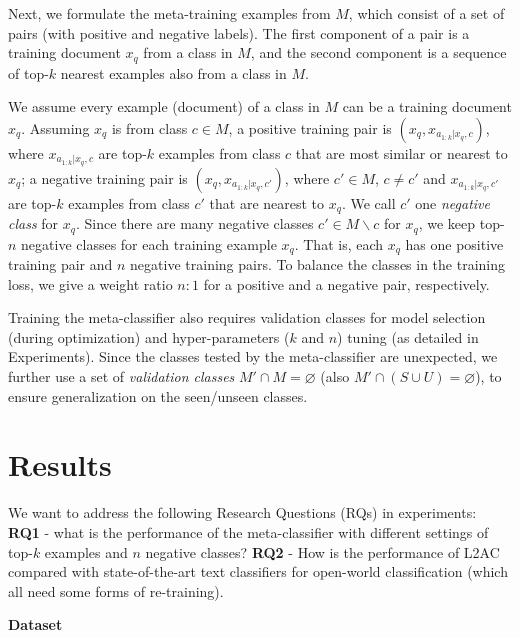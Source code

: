 Next, we formulate the meta-training examples from $M$, which consist of a set of pairs 
(with positive and negative labels). 
The first component of a pair is a training document $x_q$ from a class in $M$, and the second component is a sequence of top-$k$ nearest examples also from a class in $M$. 

We assume every example (document) of a class in $M$ can be a training document $x_q$.
Assuming $x_q$ is from class $c \in M$,
a positive training pair is $(x_q, x_{a_{1:k}|x_q, c})$, where $x_{a_{1:k}|x_q, c}$ are top-$k$ examples from class $c$ that are most similar or nearest to $x_q$;
a negative training pair is $(x_q, x_{a_{1:k}|x_q, c'})$, where $c' \in M$, $c \neq c'$ and $x_{a_{1:k}|x_q, c'}$ are top-$k$ examples from class $c'$ that are nearest to $x_q$.
We call $c'$ one \emph{negative class} for $x_q$.
Since there are many negative classes $c' \in M\backslash c$ for $x_q$, we keep top-$n$ negative classes for each training example $x_q$. 
That is, each $x_q$ has one positive training pair and $n$ negative training pairs.
To balance the classes in the training loss, we give a weight ratio $n:1$ for a positive and a negative pair, respectively.

Training the meta-classifier also requires validation classes for model selection (during optimization) and hyper-parameters ($k$ and $n$) tuning (as detailed in Experiments).
Since the classes tested by the meta-classifier are unexpected, we further use a set of  \textit{validation classes} $M'\cap M=\varnothing$ (also $M'\cap (S\cup U)=\varnothing$), to ensure generalization on the seen/unseen classes.

\section{Results}
\label{chap2:sec:exp}

We want to address the following Research Questions (RQs) in experiments:
\textbf{RQ1} - what is the performance of the meta-classifier with different settings of top-$k$ examples and $n$ negative classes?
\textbf{RQ2} - How is the performance of L2AC compared with state-of-the-art text classifiers for open-world classification (which all need some forms of re-training).

\textbf{Dataset}

